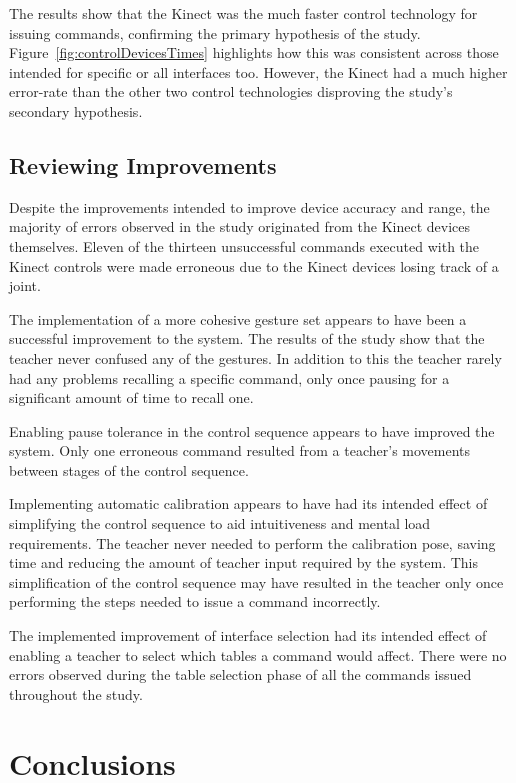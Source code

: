 \documentclass[link]{IWCOMP}
\begin{document}
The results show that the Kinect was the much faster control technology for issuing commands, confirming the primary hypothesis of the study.
Figure~\ref{fig:controlDevicesTimes} highlights how this was consistent across those intended for specific or all interfaces too.
However, the Kinect had a much higher error-rate than the other two control technologies disproving the study's secondary hypothesis.

\subsection{Reviewing Improvements}
\label{subsec:reviewingImprovements}

Despite the improvements intended to improve device accuracy and range, the majority of errors observed in the study originated from the Kinect devices themselves.
Eleven of the thirteen unsuccessful commands executed with the Kinect controls were made erroneous due to the Kinect devices losing track of a joint.

The implementation of a more cohesive gesture set appears to have been a successful improvement to the system.
The results of the study show that the teacher never confused any of the gestures.
In addition to this the teacher rarely had any problems recalling a specific command, only once pausing for a significant amount of time to recall one.

Enabling pause tolerance in the control sequence appears to have improved the system.
Only one erroneous command resulted from a teacher's movements between stages of the control sequence.

Implementing automatic calibration appears to have had its intended effect of simplifying the control sequence to aid intuitiveness and mental load requirements.
The teacher never needed to perform the calibration pose, saving time and reducing the amount of teacher input required by the system.
This simplification of the control sequence may have resulted in the teacher only once performing the steps needed to issue a command incorrectly.

The implemented improvement of interface selection had its intended effect of enabling a teacher to select which tables a command would affect.
There were no errors observed during the table selection phase of all the commands issued throughout the study.

\section{Conclusions}
\label{sec:conclusions}
\end{document}
